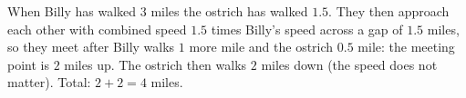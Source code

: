 When Billy has walked $3$ miles the ostrich has walked $1.5$. They then approach each other with combined speed $1.5$ times Billy's speed across a gap of $1.5$ miles, so they meet after Billy walks $1$ more mile and the ostrich $0.5$ mile: the meeting point is $2$ miles up. The ostrich then walks $2$ miles down (the speed does not matter). Total: $2+2=\boxed{4}$ miles.
